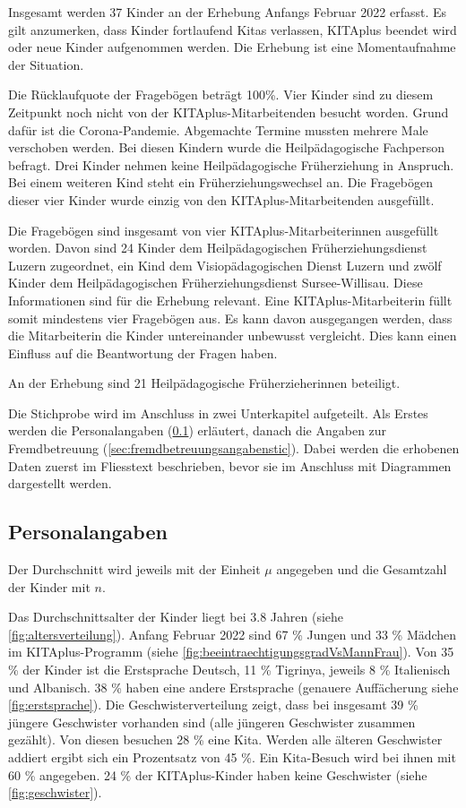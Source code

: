 \documentclass[
  ngerman,
  11pt,
  paper=a4,
  twoside,
  titlepage=true,
  openright,
  abstract=on,
  toc=listofnumbered,
  numbers=noenddot,
  chapterprefix=true,
  headings=optiontohead,
  svgnames,
  dvipsnames]{scrreprt}
\begin{document}
Insgesamt werden 37 Kinder an der Erhebung Anfangs Februar 2022 erfasst.
Es gilt anzumerken, dass Kinder fortlaufend Kitas verlassen, KITAplus
beendet wird oder neue Kinder aufgenommen werden. Die Erhebung ist eine
Momentaufnahme der Situation.

Die Rücklaufquote der Fragebögen beträgt 100\%. Vier Kinder sind zu
diesem Zeitpunkt noch nicht von der KITAplus-Mitarbeitenden besucht
worden. Grund dafür ist die Corona-Pandemie. Abgemachte Termine mussten
mehrere Male verschoben werden. Bei diesen Kindern wurde die
Heilpädagogische Fachperson befragt. Drei Kinder nehmen keine
Heilpädagogische Früherziehung in Anspruch. Bei einem weiteren Kind
steht ein Früherziehungswechsel an. Die Fragebögen dieser vier Kinder
wurde einzig von den KITAplus-Mitarbeitenden ausgefüllt.

Die Fragebögen sind insgesamt von vier KITAplus-Mitarbeiterinnen
ausgefüllt worden. Davon sind 24 Kinder dem Heilpädagogischen
Früherziehungsdienst Luzern zugeordnet, ein Kind dem Visiopädagogischen
Dienst Luzern und zwölf Kinder dem Heilpädagogischen
Früherziehungsdienst Sursee-Willisau. Diese Informationen sind für die
Erhebung relevant. Eine KITAplus-Mitarbeiterin füllt somit mindestens
vier Fragebögen aus. Es kann davon ausgegangen werden, dass die
Mitarbeiterin die Kinder untereinander unbewusst vergleicht. Dies kann
einen Einfluss auf die Beantwortung der Fragen haben.

An der Erhebung sind 21 Heilpädagogische Früherzieherinnen beteiligt.

Die Stichprobe wird im Anschluss in zwei Unterkapitel aufgeteilt. Als
Erstes werden die Personalangaben (\cref{sec:personalangabenstic})
erläutert, danach die Angaben zur Fremdbetreuung
(\cref{sec:fremdbetreuungsangabenstic}). Dabei werden die erhobenen
Daten zuerst im Fliesstext beschrieben, bevor sie im Anschluss mit
Diagrammen dargestellt werden.

\hypertarget{sec:personalangabenstic}{%
\subsection{Personalangaben}\label{sec:personalangabenstic}}

Der Durchschnitt wird jeweils mit der Einheit \(\mu\) angegeben und die
Gesamtzahl der Kinder mit \(n\).

Das Durchschnittsalter der Kinder liegt bei 3.8 Jahren (siehe
\cref{fig:altersverteilung}). Anfang Februar 2022 sind 67 \% Jungen und
33 \% Mädchen im KITAplus-Programm (siehe
\cref{fig:beeintraechtigungsgradVsMannFrau}). Von 35 \% der Kinder ist
die Erstsprache Deutsch, 11 \% Tigrinya, jeweils 8 \% Italienisch und
Albanisch. 38 \% haben eine andere Erstsprache (genauere Auffächerung
siehe \cref{fig:erstsprache}). Die Geschwisterverteilung zeigt, dass bei
insgesamt 39 \% jüngere Geschwister vorhanden sind (alle jüngeren
Geschwister zusammen gezählt). Von diesen besuchen 28 \% eine Kita.
Werden alle älteren Geschwister addiert ergibt sich ein Prozentsatz von
45 \%. Ein Kita-Besuch wird bei ihnen mit 60 \% angegeben. 24 \% der
KITAplus-Kinder haben keine Geschwister (siehe \cref{fig:geschwister}).
\end{document}
